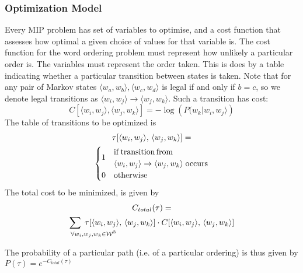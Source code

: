\documentclass[twocolumn]{article}
\begin{document}
\subsubsection{Optimization Model}
Every MIP problem has set of variables to optimise, and a cost function that assesses how optimal a given choice of values for that variable is. The cost function for the word ordering problem must represent how unlikely a particular order is. The variables must represent the order taken. This is does by a table indicating whether a particular transition between states is taken. Note that for any pair of Markov states $\langle w_{a},w_{b}\rangle,\langle w_{c},w_{d}\rangle$ is legal if and only if $b=c$, so we denote legal transitions as $\langle w_{i},w_{j}\rangle \to \langle w_{j},w_{k}\rangle$.
%
Such a transition has cost:
\begin{equation*}
	C[\langle w_{i},w_{j}\rangle,\langle w_{j},w_{k}\rangle]=-\log\left(P(w_{k}|w_{i},w_{j}\rangle\right)
\end{equation*} 
%
The table of transitions to be optimized is 
\displayunskip
\begin{multline*}
 \tau[\langle w_{i},w_{j}\rangle,\,\langle w_{j},w_{k}\rangle] = \\
 \begin{cases}
	 \multirow{2}{*}{1} & \mathrm{if\,transition\,from} \\
	 	                & \langle w_{i},w_{j}\rangle \to \langle w_{j},w_{k}\rangle
	 	                   \;\mathrm{ occurs} \\
                     0  & \mathrm{otherwise}
  \end{cases}
\end{multline*}
%
The total cost to be minimized, is given by
\displayunskip
\begin{multline*}
 C_{total}(\tau)= \\
	 \sum_{\mathrlap{\!\!\!\!\forall w_i,w_j,w_k \in \W^{3}
 	}}
 	\;\tau[\langle w_{i},w_{j}\rangle,\,\langle w_{j},w_{k}\rangle] \cdot C[\langle w_{i},w_{j}\rangle,\,\langle w_{j},w_{k}\rangle]
\end{multline*}


The probability of a particular path (i.e. of a particular ordering)
is thus given by $P(\tau)=e^{-C_{total}(\tau)}$
\end{document}
